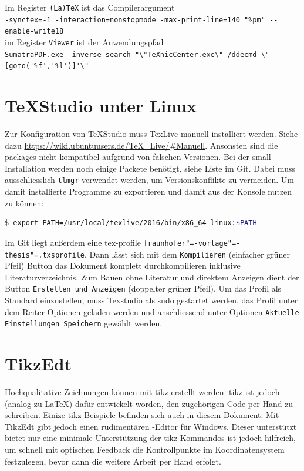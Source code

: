 Im Register \texttt{(La)TeX} ist das Compilerargument\\
{\small\verb#-synctex=-1 -interaction=nonstopmode -max-print-line=140 "%pm" --enable-write18#}\\
im Register \texttt{Viewer} ist der Anwendungspfad\\
{\small\verb#SumatraPDF.exe -inverse-search "\"TeXnicCenter.exe\" /ddecmd \"[goto('%f','%l')]'\"#}\\

\section{TeXStudio unter Linux}
Zur Konfiguration von TeXStudio muss TexLive manuell installiert werden. Siehe dazu \url{https://wiki.ubuntuusers.de/TeX_Live/#Manuell}. Ansonsten sind die packages nicht kompatibel aufgrund von falschen Versionen. 
Bei der small Installation werden noch einige Packete benötigt, siehe Liste im Git. Dabei muss ausschliesslich \texttt{tlmgr} verwendet werden, um Versionskonflikte zu vermeiden. Um damit installierte Programme zu exportieren und damit aus der Konsole nutzen zu können: \begin{lstlisting}[language=bash]
$ export PATH=/usr/local/texlive/2016/bin/x86_64-linux:$PATH
\end{lstlisting}
Im Git liegt außerdem eine tex-profile \texttt{fraunhofer"=-vorlage"=-thesis"=.txsprofile}. Dann lässt sich mit dem \texttt{Kompilieren} (einfacher grüner Pfeil) Button das Dokument komplett durchkompilieren inklusive Literaturverzeichnis. Zum Bauen ohne Literatur und direktem Anzeigen dient der Button \texttt{Erstellen und Anzeigen} (doppelter grüner Pfeil).
Um das Profil als Standard einzustellen, muss Texstudio als sudo gestartet werden, das Profil unter dem Reiter Optionen geladen werden und anschliessend unter Optionen \texttt{Aktuelle Einstellungen Speichern} gewählt werden. 



\section{TikzEdt}

Hochqualitative Zeichnungen können mit \gls{tikz} erstellt werden. \Gls{tikz} ist jedoch
(analog zu LaTeX) dafür entwickelt worden, den zugehörigen Code per Hand zu
schreiben. Einize \gls{tikz}-Beispiele befinden sich auch in diesem Dokument.
Mit TikzEdt gibt jedoch einen rudimentären -Editor für Windows. Dieser
unterstützt bietet nur eine minimale Unterstützung der \gls{tikz}-Kommandos ist jedoch
hilfreich, um schnell mit optischen Feedback die Kontrollpunkte im
Koordinatensystem festzulegen, bevor dann die weitere Arbeit per Hand erfolgt.


